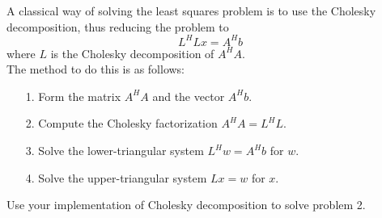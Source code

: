 A classical way of solving the least squares problem is to use the Cholesky decomposition, thus reducing the problem to 
\begin{equation*}
 L^HLx=A^Hb
\end{equation*}
where $L$ is the Cholesky decomposition of $A^HA$.\\
The method to do this is as follows:
\begin{enumerate}
\item[1.] Form the matrix $A^HA$ and the vector $A^Hb$.
\item[2.] Compute the Cholesky factorization $A^HA=L^HL$.
\item[3.] Solve the lower-triangular system $L^Hw=A^Hb$ for $w$.
\item[4.] Solve the upper-triangular system $Lx=w$ for $x$.
\end{enumerate}



\begin{comment}
algorithm taken from Trefethen, Numerical Linear Algebra pg. 82
\end{comment}


\begin{problem}
Use your implementation of Cholesky decomposition to solve problem 2.
\end{problem}



\begin{comment}
\begin{problem}
Compare how your Cholesky decomposition performs against your LU decomposition from Lab \ref{lab:LUdecomp}.  Perform the following comparisons by decomposing increasingly large positive definite matrices.  Plot the comparison results.
\begin{itemize}
 \item Runtime: Time how long each decomposition needs to decompose the input matrix.
 \item Operations: Count the number of operations needed to compute each decomposition.  This can be done by adding a line in the loop to count each time an operation occurs.
\end{itemize}
\end{problem}
\end{comment}